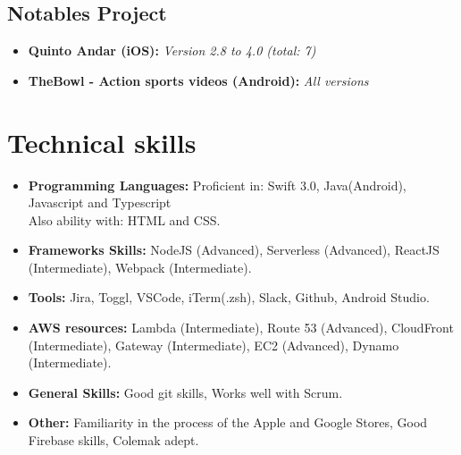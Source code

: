 \documentclass[11pt,a4paper,sans]{moderncv}
\begin{document}
\subsection{Notables Project}

\vspace{5pt}

\begin{itemize}

\item{\textbf{Quinto Andar (iOS):} \textit{Version 2.8 to 4.0 (total: 7)}}

\item{\textbf{TheBowl - Action sports videos (Android):} \textit{All versions}}

\end{itemize}

\section{Technical skills}

\vspace{6pt}

\begin{itemize}

\item \textbf{Programming Languages:} Proficient in: Swift 3.0, Java(Android), Javascript and Typescript\\ Also ability with: HTML and CSS.

\vspace{6pt}

\item \textbf{Frameworks Skills:} NodeJS (Advanced), Serverless (Advanced), ReactJS (Intermediate), Webpack (Intermediate).

\vspace{6pt}

\item \textbf{Tools:} Jira, Toggl, VSCode, iTerm(.zsh), Slack, Github, Android Studio.
\vspace{6pt}

\item \textbf{AWS resources:}  Lambda (Intermediate), Route 53 (Advanced), CloudFront (Intermediate), Gateway (Intermediate), EC2 (Advanced), Dynamo (Intermediate).

\vspace{6pt}

\item \textbf{General Skills:} Good git skills, Works well with Scrum.

\vspace{6pt}

\item \textbf{Other:} Familiarity in the process of the Apple and Google Stores, Good Firebase skills, Colemak adept.

\end{itemize}
\end{document}
